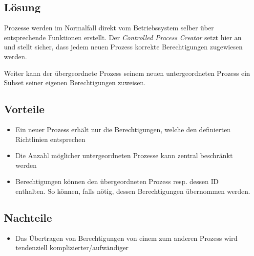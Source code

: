 \subsection*{Lösung}
Prozesse werden im Normalfall direkt vom Betriebssystem selber über entsprechende Funktionen erstellt. Der \emph{Controlled Process Creator} setzt hier an und stellt sicher, dass jedem neuen Prozess korrekte Berechtigungen zugewiesen werden.

Weiter kann der übergeordnete Prozess seinem neuen untergeordneten Prozess ein Subset seiner eigenen Berechtigungen zuweisen.


\subsection*{Vorteile}
\begin{itemize}
	\item Ein neuer Prozess erhält nur die Berechtigungen, welche den definierten Richtlinien entsprechen
	\item Die Anzahl möglicher untergeordneten Prozesse kann zentral beschränkt werden
	\item Berechtigungen können den übergeordneten Prozess resp. dessen ID enthalten. So können, falls nötig, dessen Berechtigungen übernommen werden.
\end{itemize}

\subsection*{Nachteile}
\begin{itemize}
	\item Das Übertragen von Berechtigungen von einem zum anderen Prozess wird tendenziell komplizierter/aufwändiger
\end{itemize}